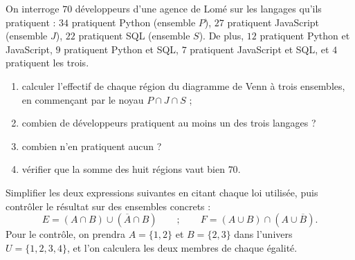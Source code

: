 \begin{exercice}
On interroge $70$ développeurs d'une agence de Lomé sur les langages qu'ils pratiquent : $34$ pratiquent Python (ensemble $P$), $27$ pratiquent JavaScript (ensemble $J$), $22$ pratiquent SQL (ensemble $S$). De plus, $12$ pratiquent Python et JavaScript, $9$ pratiquent Python et SQL, $7$ pratiquent JavaScript et SQL, et $4$ pratiquent les trois.
\begin{enumerate}
\item calculer l'effectif de chaque région du diagramme de Venn à trois ensembles, en commençant par le noyau $P \cap J \cap S$ ;
\item combien de développeurs pratiquent au moins un des trois langages ?
\item combien n'en pratiquent aucun ?
\item vérifier que la somme des huit régions vaut bien $70$.
\end{enumerate}
\end{exercice}

\begin{exercice}
Simplifier les deux expressions suivantes en citant chaque loi utilisée, puis contrôler le résultat sur des ensembles concrets :
\[
E = (A \cap B) \cup (\overline{A} \cap B)
\qquad ; \qquad
F = (A \cup B) \cap (A \cup \overline{B}) .
\]
Pour le contrôle, on prendra $A = \{1, 2\}$ et $B = \{2, 3\}$ dans l'univers $U = \{1, 2, 3, 4\}$, et l'on calculera les deux membres de chaque égalité.
\end{exercice}
